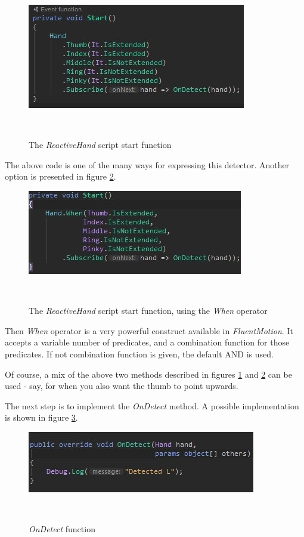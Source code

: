 \documentclass{sigchi}
\def\fluentmotion{\textit{FluentMotion}}
\begin{document}
\begin{figure}[h]
  \centering
  \includegraphics[width=0.9\columnwidth]{figures/FluentMotion_script}
  \caption{The \textit{ReactiveHand} script start function}~\label{fig:figure7}
\end{figure}

The above code is one of the many ways for expressing this detector. Another option is presented in figure \ref{fig:figure8}.

\begin{figure}[H]
  \centering
  \includegraphics[width=0.9\columnwidth]{figures/FluentMotion_script_alternative}
  \caption{The \textit{ReactiveHand} script start function, using the \textit{When} operator}~\label{fig:figure8}
\end{figure}

Then \textit{When} operator is a very powerful construct available in \fluentmotion{}. It accepts a variable number of predicates, and a combination function for those predicates. If not combination function is given, the default AND is used.


Of course, a mix of the above two methods described in figures \ref{fig:figure7} and \ref{fig:figure8} can be used - say, for when you also want the thumb to point upwards.


The next step is to implement the \textit{OnDetect} method. A possible implementation is shown in figure \ref{fig:figure9}.

\begin{figure}[h]
  \centering
  \includegraphics[width=0.9\columnwidth]{figures/FluentMotion_onDetect}
  \caption{\textit{OnDetect} function}~\label{fig:figure9}
\end{figure}
\end{document}
